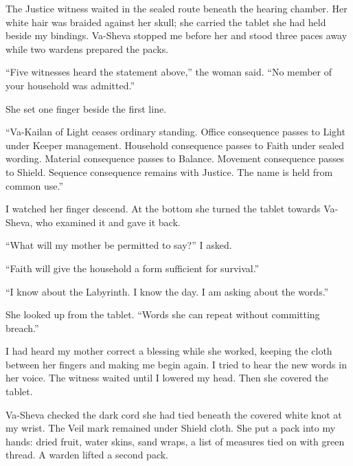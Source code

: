 
\ornament

The Justice witness waited in the sealed route beneath the hearing chamber. Her white hair was braided against her skull; she carried the tablet she had held beside my bindings. Va-Sheva stopped me before her and stood three paces away while two wardens prepared the packs.\par

``Five witnesses heard the statement above,'' the woman said. ``No member of your household was admitted.''\par

She set one finger beside the first line.\par

``Va-Kailan of Light ceases ordinary standing. Office consequence passes to Light under Keeper management. Household consequence passes to Faith under sealed wording. Material consequence passes to Balance. Movement consequence passes to Shield. Sequence consequence remains with Justice. The name is held from common use.''\par

I watched her finger descend. At the bottom she turned the tablet towards Va-Sheva, who examined it and gave it back.\par

``What will my mother be permitted to say?'' I asked.\par

``Faith will give the household a form sufficient for survival.''\par

``I know about the Labyrinth. I know the day. I am asking about the words.''\par

She looked up from the tablet. ``Words she can repeat without committing breach.''\par

I had heard my mother correct a blessing while she worked, keeping the cloth between her fingers and making me begin again. I tried to hear the new words in her voice. The witness waited until I lowered my head. Then she covered the tablet.\par

Va-Sheva checked the dark cord she had tied beneath the covered white knot at my wrist. The Veil mark remained under Shield cloth. She put a pack into my hands: dried fruit, water skins, sand wraps, a list of measures tied on with green thread. A warden lifted a second pack.\par

